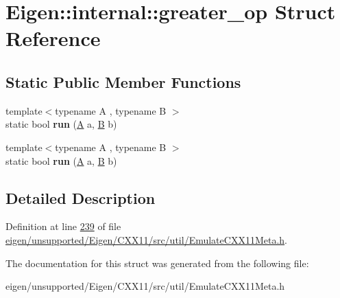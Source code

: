 \hypertarget{struct_eigen_1_1internal_1_1greater__op}{}\section{Eigen\+:\+:internal\+:\+:greater\+\_\+op Struct Reference}
\label{struct_eigen_1_1internal_1_1greater__op}
\subsection*{Static Public Member Functions}
\begin{DoxyCompactItemize}
\item 
\mbox{\label{struct_eigen_1_1internal_1_1greater__op_a63c772d1e7a21703744bb0c71ecfb874}} 
{\footnotesize template$<$typename A , typename B $>$ }\\static bool {\bfseries run} (\hyperlink{group___core___module_class_eigen_1_1_matrix}{A} a, \hyperlink{group___core___module_class_eigen_1_1_matrix}{B} b)
\item 
\mbox{\label{struct_eigen_1_1internal_1_1greater__op_a63c772d1e7a21703744bb0c71ecfb874}} 
{\footnotesize template$<$typename A , typename B $>$ }\\static bool {\bfseries run} (\hyperlink{group___core___module_class_eigen_1_1_matrix}{A} a, \hyperlink{group___core___module_class_eigen_1_1_matrix}{B} b)
\end{DoxyCompactItemize}


\subsection{Detailed Description}


Definition at line \hyperlink{eigen_2unsupported_2_eigen_2_c_x_x11_2src_2util_2_emulate_c_x_x11_meta_8h_source_l00239}{239} of file \hyperlink{eigen_2unsupported_2_eigen_2_c_x_x11_2src_2util_2_emulate_c_x_x11_meta_8h_source}{eigen/unsupported/\+Eigen/\+C\+X\+X11/src/util/\+Emulate\+C\+X\+X11\+Meta.\+h}.



The documentation for this struct was generated from the following file\+:\begin{DoxyCompactItemize}
\item 
eigen/unsupported/\+Eigen/\+C\+X\+X11/src/util/\+Emulate\+C\+X\+X11\+Meta.\+h\end{DoxyCompactItemize}
